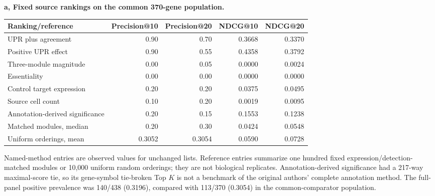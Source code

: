 \documentclass[a4paper,fleqn]{cas-sc}
\makeatletter
\DeclareRobustCommand{\rev}[1]{{\color{red}\def\@citecolor{black}\def\@linkcolor{red}\def\@urlcolor{red}#1}}
\makeatother
\begin{document}
\begin{samepage}
\rev{\textbf{a, Fixed source rankings on the common 370-gene population.}}
\begin{center}
\begin{tabular}{lrrrr}
\toprule
\rev{Ranking/reference} & \rev{Precision@10} & \rev{Precision@20} & \rev{NDCG@10} & \rev{NDCG@20}\\
\midrule
\rev{UPR plus agreement} & \rev{0.90} & \rev{0.70} & \rev{0.3668} & \rev{0.3370}\\
\rev{Positive UPR effect} & \rev{0.90} & \rev{0.55} & \rev{0.4358} & \rev{0.3792}\\
\rev{Three-module magnitude} & \rev{0.00} & \rev{0.05} & \rev{0.0000} & \rev{0.0024}\\
\rev{Essentiality} & \rev{0.00} & \rev{0.00} & \rev{0.0000} & \rev{0.0000}\\
\rev{Control target expression} & \rev{0.20} & \rev{0.20} & \rev{0.0375} & \rev{0.0495}\\
\rev{Source cell count} & \rev{0.10} & \rev{0.20} & \rev{0.0019} & \rev{0.0095}\\
\rev{Annotation-derived significance} & \rev{0.20} & \rev{0.15} & \rev{0.1553} & \rev{0.1238}\\
\rev{Matched modules, median} & \rev{0.20} & \rev{0.30} & \rev{0.0424} & \rev{0.0548}\\
\rev{Uniform orderings, mean} & \rev{0.3052} & \rev{0.3054} & \rev{0.0590} & \rev{0.0728}\\
\bottomrule
\end{tabular}
\end{center}
\end{samepage}

\rev{Named-method entries are observed values for unchanged lists.} \rev{Reference entries summarize one hundred fixed expression/detection-matched modules or 10,000 uniform random orderings; they are not biological replicates.} \rev{Annotation-derived significance had a 217-way maximal-score tie, so its gene-symbol tie-broken Top $K$ is not a benchmark of the original authors' complete annotation method.} \rev{The full-panel positive prevalence was 140/438 (0.3196), compared with 113/370 (0.3054) in the common-comparator population.}
\end{document}
